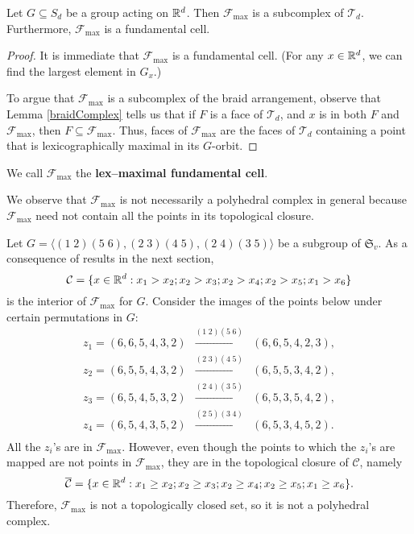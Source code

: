 \begin{prop}
Let $G \subseteq S_d$ be a group acting on $\mathbb{R}^d$. Then $\mathcal{F}_{\max}$ is a subcomplex of $\mathcal{T}_d$. Furthermore, $\mathcal{F}_{\max}$ is a fundamental cell.
\end{prop}

\begin{proof}
It is immediate that $\mathcal{F}_{\max}$ is a fundamental cell. (For any $x\in \mathbb{R}^d$, we can find the largest element in $G_x$.)

To argue that $\mathcal{F}_{\max}$ is a subcomplex of the braid arrangement, observe that Lemma \ref{braidComplex} tells us that if $F$ is a face of $\mathcal{T}_d$, and $x$ is in both $F$ and $\mathcal{F}_{\max}$, then $F \subseteq \mathcal{F}_{\max}$. Thus, faces of $\mathcal{F}_{\max}$ are the faces of $\mathcal{T}_d$ containing a point that is lexicographically maximal in its $G$-orbit.
\end{proof}

We call $\mathcal{F}_{\max}$ the \textbf{lex--maximal fundamental cell}.

We observe that $\mathcal{F}_{\max}$ is not necessarily a polyhedral complex in general because $\mathcal{F}_{\max}$ need not contain all the points in its topological closure.

\begin{example}
Let \(G = \langle (1\;2)(5\;6),(2\;3)(4\;5),(2\;4)(3\;5)\rangle\) be a subgroup of \(\mathfrak{S}_v\). As a consequence of results in the next section,  \[\mathcal{C} = \{x\in\mathbb{R}^d : x_1 > x_2; x_2 > x_3; x_2 > x_4; x_2 > x_5; x_1 > x_6\}\] is the interior of \(\mathcal{F}_{\max}\) for $G$. Consider the images of the points below under certain permutations in $G$:
\begin{eqnarray*}
z_1 = (6,6,5,4,3,2) &\xrightarrow{(1 \; 2)(5 \; 6)} &(6,6,5,4,2,3),\\
z_2 = (6,5,5,4,3,2) &\xrightarrow{(2 \; 3)(4 \; 5)} &(6,5,5,3,4,2),\\
z_3 = (6,5,4,5,3,2) &\xrightarrow{(2 \; 4)(3 \; 5)} &(6,5,3,5,4,2),\\
z_4 = (6,5,4,3,5,2) &\xrightarrow{(2 \; 5)(3 \; 4)} &(6,5,3,4,5,2).\\
\end{eqnarray*}
All the $z_i$'s are in $\mathcal{F}_{\max}$. However, even though the points to which the $z_i$'s are mapped are not points in $\mathcal{F}_{\max}$, they are in the topological closure of $\mathcal{C}$, namely \[\overline{\mathcal{C}} = \{x\in\mathbb{R}^d : x_1 \ge x_2; x_2 \ge x_3; x_2 \ge x_4; x_2 \ge x_5; x_1 \ge x_6\}.\] Therefore, $\mathcal{F}_{\max}$ is not a topologically closed set, so it is not a polyhedral complex.
\end{example}


